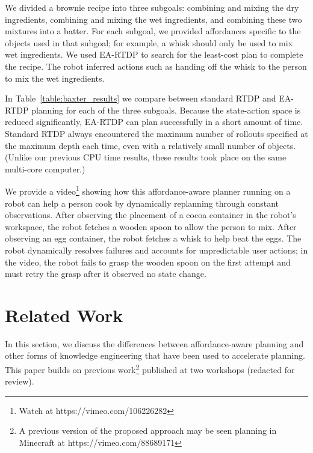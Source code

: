 \documentclass[letterpaper]{article}
\begin{document}
We divided a brownie recipe into three subgoals: combining and mixing
the dry ingredients, combining and mixing the wet ingredients, and
combining these two mixtures into a batter. For each subgoal, we
provided affordances specific to the objects used in that subgoal; for
example, a whisk should only be used to mix wet ingredients.  We used
EA-RTDP to search for the least-cost plan to complete the recipe.  The
robot inferred actions such as handing off the whisk to the person to
mix the wet ingredients.


In Table~\ref{table:baxter_results} we compare between standard RTDP
and EA-RTDP planning for each of the three subgoals. Because the
state-action space is reduced significantly, EA-RTDP can plan
successfully in a short amount of time. Standard RTDP always
encountered the maximum number of rollouts specified at the maximum
depth each time, even with a relatively small number of objects.
(Unlike our previous CPU time results, these results took place on the
same multi-core computer.)

We provide a video\footnote{Watch at https://vimeo.com/106226282} 
showing how this affordance-aware planner running
on a robot can help a person cook by dynamically replanning through
constant observations. After observing the placement of a cocoa
container in the robot's workspace, the robot fetches a wooden spoon
to allow the person to mix. After observing an egg container, the
robot fetches a whisk to help beat the eggs. 
The robot dynamically resolves failures and accounts for unpredictable
user actions; in the video, the robot fails to grasp the wooden spoon on
the first attempt and must retry the grasp after it observed no state
change.


\section{Related Work}
\label{sec:related-work}

In this section, we discuss the differences between affordance-aware
planning and other forms of knowledge engineering that have been used
to accelerate planning.  This paper builds on previous work\footnote{A
  previous version of the proposed approach may be seen planning in
  Minecraft at https://vimeo.com/88689171} published at two workshops
(redacted for review).
\end{document}
